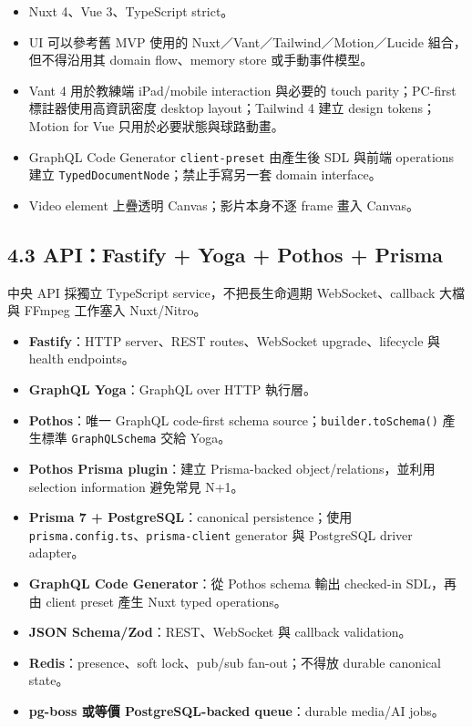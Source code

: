 \documentclass[
  9pt,
  a4paper,
]{article}
\providecommand{\tightlist}{%
  \setlength{\itemsep}{0pt}\setlength{\parskip}{0pt}}
\begin{document}
\begin{itemize}
\tightlist
\item
  Nuxt 4、Vue 3、TypeScript strict。
\item
  UI 可以參考舊 MVP 使用的 Nuxt／Vant／Tailwind／Motion／Lucide
  組合，但不得沿用其 domain flow、memory store 或手動事件模型。
\item
  Vant 4 用於教練端 iPad/mobile interaction 與必要的 touch parity；PC-first 標註器使用高資訊密度 desktop layout；Tailwind 4 建立 design
  tokens；Motion for Vue 只用於必要狀態與球路動畫。
\item
  GraphQL Code Generator \texttt{client-preset} 由產生後 SDL 與前端
  operations 建立 \texttt{TypedDocumentNode}；禁止手寫另一套 domain
  interface。
\item
  Video element 上疊透明 Canvas；影片本身不逐 frame 畫入 Canvas。
\end{itemize}

\subsection{4.3 API：Fastify + Yoga + Pothos +
Prisma}\label{43-apifastify--yoga--pothos--prisma}

中央 API 採獨立 TypeScript service，不把長生命週期 WebSocket、callback
大檔與 FFmpeg 工作塞入 Nuxt/Nitro。

\begin{itemize}
\tightlist
\item
  \textbf{Fastify}：HTTP server、REST routes、WebSocket
  upgrade、lifecycle 與 health endpoints。
\item
  \textbf{GraphQL Yoga}：GraphQL over HTTP 執行層。
\item
  \textbf{Pothos}：唯一 GraphQL code-first schema
  source；\texttt{builder.toSchema()} 產生標準 \texttt{GraphQLSchema}
  交給 Yoga。
\item
  \textbf{Pothos Prisma plugin}：建立 Prisma-backed
  object/relations，並利用 selection information 避免常見 N+1。
\item
  \textbf{Prisma 7 + PostgreSQL}：canonical persistence；使用
  \texttt{prisma.config.ts}、\texttt{prisma-client} generator 與
  PostgreSQL driver adapter。
\item
  \textbf{GraphQL Code Generator}：從 Pothos schema 輸出 checked-in
  SDL，再由 client preset 產生 Nuxt typed operations。
\item
  \textbf{JSON Schema/Zod}：REST、WebSocket 與 callback validation。
\item
  \textbf{Redis}：presence、soft lock、pub/sub fan-out；不得放 durable
  canonical state。
\item
  \textbf{pg-boss 或等價 PostgreSQL-backed queue}：durable media/AI
  jobs。
\end{itemize}
\end{document}
